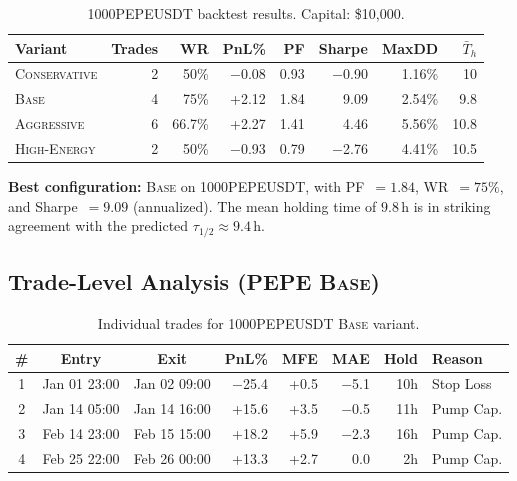 \documentclass[11pt,a4paper]{article}
\begin{document}
\begin{table}[H]
\centering
\caption{1000PEPEUSDT backtest results. Capital: \$10,000.}
\label{tab:pepe}
\renewcommand{\arraystretch}{1.15}
\begin{tabular}{lrrrrrrr}
\toprule
Variant & Trades & WR & PnL\% & PF & Sharpe & MaxDD & $\bar{T}_h$ \\
\midrule
\textsc{Conservative} & 2 & 50\% & $-$0.08 & 0.93 & $-$0.90 & 1.16\% & 10 \\
\rowcolor{boxblue}
\textsc{Base} & 4 & 75\% & +2.12 & 1.84 & 9.09 & 2.54\% & 9.8 \\
\textsc{Aggressive} & 6 & 66.7\% & +2.27 & 1.41 & 4.46 & 5.56\% & 10.8 \\
\textsc{High-Energy} & 2 & 50\% & $-$0.93 & 0.79 & $-$2.76 & 4.41\% & 10.5 \\
\bottomrule
\end{tabular}
\end{table}

\noindent\textbf{Best configuration:} \textsc{Base} on 1000PEPEUSDT, with 
PF~$= 1.84$, WR~$= 75\%$, and Sharpe~$= 9.09$ (annualized). The mean holding 
time of $9.8$\,h is in striking agreement with the predicted 
$\tau_{1/2} \approx 9.4$\,h.

\subsection{Trade-Level Analysis (PEPE \textsc{Base})}

\begin{table}[H]
\centering
\caption{Individual trades for 1000PEPEUSDT \textsc{Base} variant.}
\label{tab:trades}
\renewcommand{\arraystretch}{1.2}
\begin{tabular}{cccrrrrl}
\toprule
\# & Entry & Exit & PnL\% & MFE & MAE & Hold & Reason \\
\midrule
1 & Jan 01 23:00 & Jan 02 09:00 & $-$25.4 & +0.5 & $-$5.1 & 10h & Stop Loss \\
2 & Jan 14 05:00 & Jan 14 16:00 & +15.6 & +3.5 & $-$0.5 & 11h & Pump Cap. \\
3 & Feb 14 23:00 & Feb 15 15:00 & +18.2 & +5.9 & $-$2.3 & 16h & Pump Cap. \\
4 & Feb 25 22:00 & Feb 26 00:00 & +13.3 & +2.7 & 0.0 & 2h & Pump Cap. \\
\bottomrule
\end{tabular}
\end{table}


\end{document}
